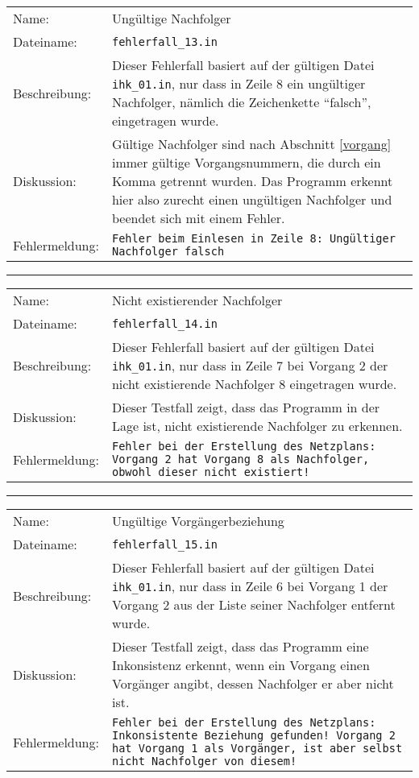 \begin{tabularx}{\textwidth}{l X}
  Name: & Ung\"ultige Nachfolger \\
  Dateiname: & \texttt{fehlerfall\_13.in} \\
  Beschreibung: & Dieser Fehlerfall basiert auf der g\"ultigen Datei
  \texttt{ihk\_01.in}, nur dass in Zeile 8 ein ung\"ultiger
  Nachfolger, n\"amlich die Zeichenkette ``falsch'',
  eingetragen wurde. \\
  Diskussion: & G\"ultige Nachfolger sind nach Abschnitt
  \ref{vorgang} immer g\"ultige Vorgangsnummern, die durch ein Komma
  getrennt wurden. Das Programm erkennt hier also zurecht einen
  ung\"ultigen Nachfolger und beendet sich mit einem Fehler.\\
  Fehlermeldung: & \texttt{Fehler beim Einlesen in Zeile 8: Ungültiger
    Nachfolger falsch} \\
\end{tabularx}
\hrule
\begin{tabularx}{\textwidth}{l X}
  Name: & Nicht existierender Nachfolger \\
  Dateiname: & \texttt{fehlerfall\_14.in} \\
  Beschreibung: & Dieser Fehlerfall basiert auf der g\"ultigen Datei
  \texttt{ihk\_01.in}, nur dass in Zeile 7 bei Vorgang 2 der nicht
  existierende Nachfolger 8 eingetragen wurde. \\
  Diskussion: & Dieser Testfall zeigt, dass das Programm in der Lage
  ist, nicht existierende Nachfolger zu erkennen. \\
  Fehlermeldung: & \texttt{Fehler bei der Erstellung des Netzplans:
    Vorgang 2 hat Vorgang 8 als Nachfolger, obwohl dieser nicht
    existiert!} \\
\end{tabularx}
\hrule
\begin{tabularx}{\textwidth}{l X}
  Name: & Ung\"ultige Vorg\"angerbeziehung \\
  Dateiname: & \texttt{fehlerfall\_15.in} \\
  Beschreibung: & Dieser Fehlerfall basiert auf der g\"ultigen Datei
  \texttt{ihk\_01.in}, nur dass in Zeile 6 bei Vorgang 1 der Vorgang 2
  aus der Liste seiner Nachfolger entfernt wurde. \\
  Diskussion: & Dieser Testfall zeigt, dass das Programm eine
  Inkonsistenz erkennt, wenn
  ein Vorgang einen Vorg\"anger angibt, dessen Nachfolger er aber
  nicht ist. \\
  Fehlermeldung: & \texttt{Fehler bei der Erstellung des Netzplans:
    Inkonsistente Beziehung gefunden! Vorgang 2 hat Vorgang 1 als
    Vorgänger, ist aber selbst nicht Nachfolger von diesem!} \\
\end{tabularx}
